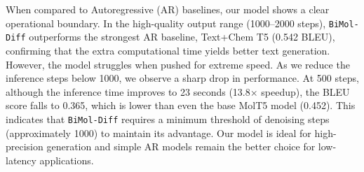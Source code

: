 \noindent When compared to Autoregressive (AR) baselines, our model shows a clear operational boundary. In the high-quality output range (1000--2000 steps), \texttt{BiMol-Diff} outperforms the strongest AR baseline, Text+Chem T5 (0.542 BLEU), confirming that the extra computational time yields better text generation. However, the model struggles when pushed for extreme speed. As we reduce the inference steps below 1000, we observe a sharp drop in performance. At 500 steps, although the inference time improves to 23 seconds (13.8$\times$ speedup), the BLEU score falls to 0.365, which is lower than even the base MolT5 model (0.452). This indicates that \texttt{BiMol-Diff} requires a minimum threshold of denoising steps (approximately 1000) to maintain its advantage. Our model is ideal for high-precision generation and simple AR models remain the better choice for low-latency applications.